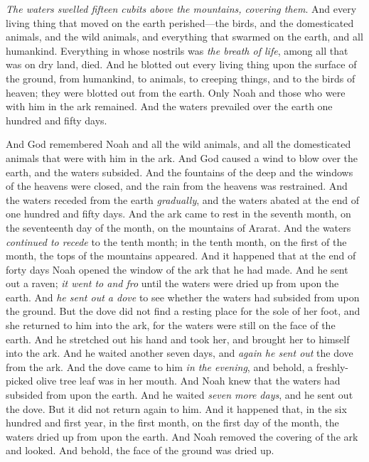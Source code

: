 \begin{biblechapter}
\verse \textit{The waters swelled fifteen cubits above the mountains, covering them}.
\verse And every living thing that moved on the earth perished—the birds, and the domesticated animals, and the wild animals, and everything that swarmed on the earth, and all humankind.
\verse Everything in whose nostrils was \textit{the breath of life}, among all that was on dry land, died.
\verse And he blotted out every living thing upon the surface of the ground, from humankind, to animals, to creeping things, and to the birds of heaven; they were blotted out from the earth. Only Noah and those who were with him in the ark remained.
\verse And the waters prevailed over the earth one hundred and fifty days.
\end{biblechapter}

\begin{biblechapter} %
 And God remembered Noah and all the wild animals, and all the domesticated animals that were with him in the ark. And God caused a wind to blow over the earth, and the waters subsided.
\verse And the fountains of the deep and the windows of the heavens were closed, and the rain from the heavens was restrained.
\verse And the waters receded from the earth \textit{gradually}, and the waters abated at the end of one hundred and fifty days.
\verse And the ark came to rest in the seventh month, on the seventeenth day of the month, on the mountains of Ararat.
\verse And the waters \textit{continued to recede} to the tenth month; in the tenth month, on the first of the month, the tops of the mountains appeared.
\verse And it happened that at the end of forty days Noah opened the window of the ark that he had made.
\verse And he sent out a raven; \textit{it went to and fro} until the waters were dried up from upon the earth.
\verse And \textit{he sent out a dove} to see whether the waters had subsided from upon the ground.
\verse But the dove did not find a resting place for the sole of her foot, and she returned to him into the ark, for the waters were still on the face of the earth. And he stretched out his hand and took her, and brought her to himself into the ark.
\verse And he waited another seven days, and \textit{again he sent out} the dove from the ark.
\verse And the dove came to him \textit{in the evening}, and behold, a freshly-picked olive tree leaf was in her mouth. And Noah knew that the waters had subsided from upon the earth.
\verse And he waited \textit{seven more days}, and he sent out the dove. But it did not return again to him.
\verse And it happened that, in the six hundred and first year, in the first month, on the first day of the month, the waters dried up from upon the earth. And Noah removed the covering of the ark and looked. And behold, the face of the ground was dried up.

\end{biblechapter}
